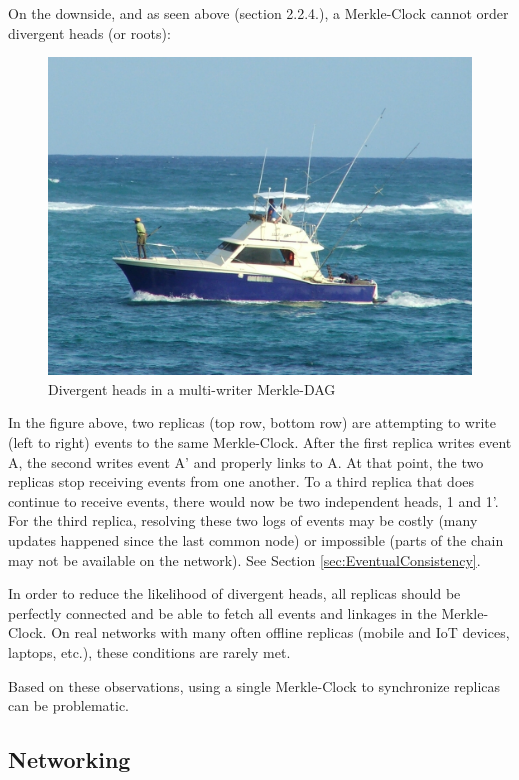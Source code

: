 \documentclass{comjnl}
\begin{document}
On the downside, and as seen above (section 2.2.4.), a Merkle-Clock cannot order divergent heads (or roots):

\begin{figure}
  \includegraphics[width=\linewidth]{boat.jpg}
  \caption{Divergent heads in a multi-writer Merkle-DAG }
  \label{fig:merkledag}
\end{figure}

In the figure above, two replicas (top row, bottom row) are attempting to write (left to right) events to the same Merkle-Clock. After the first replica writes event A, the second writes event A’ and properly links to A. At that point, the two replicas stop receiving events from one another. To a third replica that does continue to receive events, there would now be two independent heads, 1 and 1’. For the third replica, resolving these two logs of events may be costly (many updates happened since the last common node) or impossible (parts of the chain may not be available on the network). See Section  \ref{sec:EventualConsistency}.

In order to reduce the likelihood of divergent heads, all replicas should be perfectly connected and be able to fetch all events and linkages in the Merkle-Clock. On real networks with many often offline replicas (mobile and IoT devices, laptops, etc.), these conditions are rarely met.

Based on these observations, using a single Merkle-Clock to synchronize replicas can be problematic.

\subsection{Networking}
\end{document}
